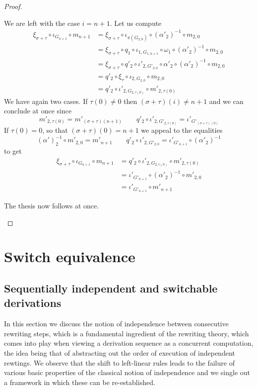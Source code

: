 \documentclass[a4paper,UKenglish,cleveref,pdftex, thm-restate,numberwithinsect]{lipics}
\begin{document}
\begin{proof}
\begin{itemize}
\begin{itemize}
	We are left with the case $i=n+1$. Let us compute
	\begin{align*}
		\xi_{\sigma+\tau}\circ \iota_{G_{n+1}} \circ m_{n+1} &= \xi_{\sigma+\tau} \circ \iota_{\pi(G_{2,0})} \circ (\alpha'_2)^{-1}\circ m_{2,0}\\&=\xi_{\sigma+\tau} \circ q_1\circ \iota_{1, G_{1,n+1}} \circ \omega_1 \circ (\alpha'_2)^{-1}\circ m_{2,0}\\&=\xi_{\sigma+\tau} \circ q'_2 \circ \iota'_{2,G'_{2,0}} \circ \alpha'_2 \circ (\alpha'_2)^{-1}\circ m_{2,0} \\&=q'_2 \circ \xi_\tau \circ \iota_{2, G_{2,0}} \circ m_{2,0}\\&=q'_2\circ \iota'_{2, G_{2,\tau(0)}} \circ m'_{2,\tau(0)}
	\end{align*}
	We have again two cases. If $\tau(0)\neq 0$ then $(\sigma+\tau)(i)\neq n+1$ and we can conclude at once since 
	\[m'_{2, \tau(0)}=m'_{(\sigma+\tau)(n+1)} \qquad q'_2\circ \iota'_{2, G'_{2,\tau(0)}}=
	\iota'_{G'_{(\sigma+\tau)(0)}}\] 
	If $\tau(0)=0$, so that  $(\sigma+\tau)(0)= n+1$ we appeal to the equalities
	\[(\alpha')^{-1}_2\circ m'_{2, 0}=m'_{n+1} \qquad q'_2\circ \iota'_{2, G'_{2, 0}}=
	\iota'_{G'_{n+1}}\circ (\alpha'_2)^{-1}\] 
	to get
	\begin{align*}
		\xi_{\sigma+\tau}\circ \iota_{G_{n+1}} \circ m_{n+1} &= q'_2\circ \iota'_{2, G_{2,\tau(0)}} \circ m'_{2,\tau(0)}\\&=	\iota'_{G'_{n+1}}\circ (\alpha'_2)^{-1}\circ m'_{2,0}\\&=\iota'_{G'_{n+1}}\circ  m'_{n+1}
	\end{align*}
\end{itemize}
The thesis now follows at once.	 \qedhere 
\end{itemize} \end{proof}
\fi 






\section{Switch equivalence }\label{sec:equi}



\subsection{Sequentially independent and switchable derivations }

In this section we discuss the notion of independence between
consecutive rewriting steps, which is a fundamental ingredient of the
rewriting theory, which comes into play when viewing a derivation
sequence as a concurrent computation, the idea being that of
abstracting out the order of execution of independent rewtings. We
observe that the shift to left-linear rules leads to the failure of
various basic properties of the classical notion of independence and
we single out a framework in which these can be re-established.
\end{document}
